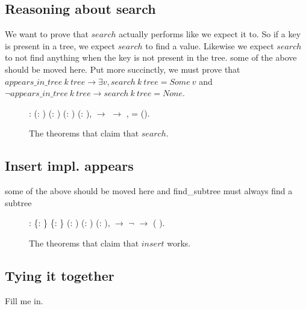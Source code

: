 \subsection{Reasoning about search}
We want to prove that $search$ actually performs like we expect it to. So if a key is present in a tree, we expect $search$ to find a value. Likewise we expect $search$ to not find anything when the key is not present in the tree.
some of the above should be moved here. Put more succinctly, we must prove that $appears\_in\_tree~k~tree \rightarrow \exists v, search~k~tree = Some~v$ and $\lnot appears\_in\_tree~k~tree \rightarrow search~k~tree = None$.

\begin{figure}
  \begin{coqdoccode}
  \coqdocnoindent
    : \coqdockw{\ensuremath{\forall}} (: ) (: ) (:   ) (: ),\coqdoceol
  \coqdocindent{1.00em}
      \ensuremath{\rightarrow} \coqdoceol
  \coqdocindent{1.00em}
     \ensuremath{\rightarrow} \coqdoceol
  \coqdocindent{1.00em}
  \coqdocvar{\ensuremath{\exists}} ,    = ().\coqdoceol
  \end{coqdoccode}
  \caption{The theorems that claim that $search$.}
  \label{fig:search_works}
\end{figure}

\subsection{Insert impl. appears}
some of the above should be moved here and find\_subtree must always find a subtree

\begin{figure}
  \begin{coqdoccode}
  \coqdocnoindent
    : \coqdockw{\ensuremath{\forall}} \{: \} \{: \} (:   ) (: ) (: ),\coqdoceol
  \coqdocindent{1.00em}
      \ensuremath{\rightarrow} \coqdoceol
  \coqdocindent{1.00em}
  \ensuremath{\lnot}   \ensuremath{\rightarrow} \coqdoceol
  \coqdocindent{1.00em}
    (   ).\coqdoceol
  \end{coqdoccode}
  \caption{The theorems that claim that $insert$ works.}
  \label{fig:insert_works}
\end{figure}

\subsection{Tying it together}
Fill me in.
